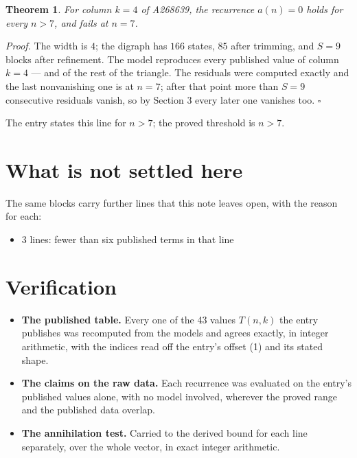 \documentclass[11pt]{article}
\newtheorem{theorem}{Theorem}
\theoremstyle{definition}
\begin{document}
\begin{theorem} For column $k = 4$ of A268639, the recurrence $a(n) = 0$ holds for every $n > 7$, and fails at $n = 7$.\end{theorem}

{\itshape Proof.} The width is $4$; the digraph has $166$ states, $85$ after trimming, and $S = 9$ blocks after refinement. The model reproduces every published value of column $k = 4$ --- and of the rest of the triangle. The residuals were computed exactly and the last nonvanishing one is at $n = 7$; after that point more than $S = 9$ consecutive residuals vanish, so by Section 3 every later one vanishes too. $\square$

The entry states this line for $n > 7$; the proved threshold is $n > 7$.

\section{What is not settled here}

The same blocks carry further lines that this note leaves open, with the reason for each:

\begin{itemize}

\item 3 lines: fewer than six published terms in that line

\end{itemize}

\section{Verification}

\begin{itemize}

\item {\bfseries The published table.} Every one of the 43 values $T(n,k)$ the entry publishes was recomputed from the models and agrees exactly, in integer arithmetic, with the indices read off the entry's offset (1) and its stated shape.

\item {\bfseries The claims on the raw data.} Each recurrence was evaluated on the entry's published values alone, with no model involved, wherever the proved range and the published data overlap.

\item {\bfseries The annihilation test.} Carried to the derived bound for each line separately, over the whole vector, in exact integer arithmetic.

\end{itemize}
\end{document}
